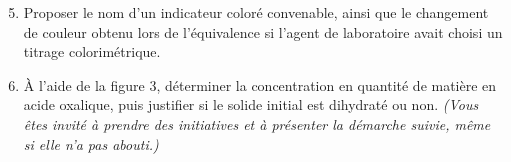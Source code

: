 \documentclass[a4paper,11pt]{article}
\begin{document}
\begin{enumerate}
\setcounter{enumi}{4}
    \item Proposer le nom d'un indicateur coloré convenable, ainsi que le changement de couleur obtenu lors de l'équivalence si l'agent de laboratoire avait choisi un titrage colorimétrique.
    \item À l'aide de la figure 3, déterminer la concentration en quantité de matière en acide oxalique, puis justifier si le solide initial est dihydraté ou non. \emph{(Vous êtes invité à prendre des initiatives et à présenter la démarche suivie, même si elle n'a pas abouti.)}
\end{enumerate}
\end{document}
